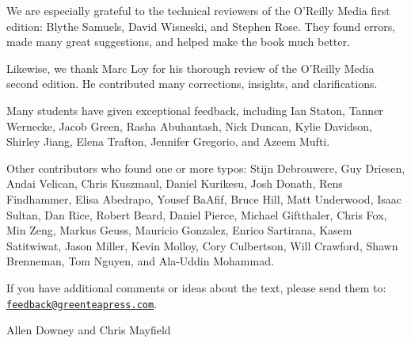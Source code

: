 We are especially grateful to the technical reviewers of the O'Reilly Media first edition: Blythe Samuels, David Wisneski, and Stephen Rose.
They found errors, made many great suggestions, and helped make the book much better.

Likewise, we thank Marc Loy for his thorough review of the O'Reilly Media second edition.
He contributed many corrections, insights, and clarifications.

Many students have given exceptional feedback, including Ian Staton, Tanner Wernecke, Jacob Green, Rasha Abuhantash, Nick Duncan, Kylie Davidson, Shirley Jiang, Elena Trafton, Jennifer Gregorio, and Azeem Mufti.

Other contributors who found one or more typos: Stijn Debrouwere, Guy Driesen, Andai Velican, Chris Kuszmaul, Daniel Kurikesu, Josh Donath, Rens Findhammer, Elisa Abedrapo, Yousef BaAfif, Bruce Hill, Matt Underwood, Isaac Sultan, Dan Rice, Robert Beard, Daniel Pierce, Michael Giftthaler, Chris Fox, Min Zeng, Markus Geuss, Mauricio Gonzalez, Enrico Sartirana, Kasem Satitwiwat, Jason Miller, Kevin Molloy, Cory Culbertson, Will Crawford, Shawn Brenneman, Tom Nguyen, and Ala-Uddin Mohammad.


If you have additional comments or ideas about the text, please send them to: \href{mailto:feedback@greenteapress.com}{\tt feedback@greenteapress.com}.

\hfill Allen Downey and Chris Mayfield
